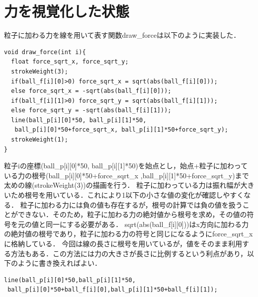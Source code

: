 \section{力を視覚化した状態}
粒子に加わる力を線を用いて表す関数draw\_forceは以下のように実装した．
\begin{screen}
{\small
\begin{verbatim}
void draw_force(int i){
  float force_sqrt_x, force_sqrt_y;
  strokeWeight(3);
  if(ball_f[i][0]>0) force_sqrt_x = sqrt(abs(ball_f[i][0]));
  else force_sqrt_x = -sqrt(abs(ball_f[i][0]));
  if(ball_f[i][1]>0) force_sqrt_y = sqrt(abs(ball_f[i][1]));
  else force_sqrt_y = -sqrt(abs(ball_f[i][1]));
  line(ball_p[i][0]*50, ball_p[i][1]*50,
   ball_p[i][0]*50+force_sqrt_x, ball_p[i][1]*50+force_sqrt_y);
  strokeWeight(1);
}
\end{verbatim}}
\end{screen}
粒子iの座標(ball\_p[i][0]*50, ball\_p[i][1]*50)を始点とし，始点+粒子に加わっている力の根号(ball\_p[i][0]*50+force\_sqrt\_x ,ball\_p[i][1]*50+force\_sqrt\_y)まで太めの線(strokeWeight(3))の描画を行う．
粒子に加わっている力は振れ幅が大きいため根号を用いている．これにより1以下の小さな値の変化が確認しやすくなる．
粒子に加わる力には負の値も存在するが，根号の計算では負の値を扱うことができない．そのため，粒子に加わる力の絶対値から根号を求め，その値の符号を元の値と同一にする必要がある．
sqrt(abs(ball\_f[i][0]))はx方向に加わる力の絶対値の根号であり，粒子に加わる力の符号と同じになるようにforce\_sqrt\_xに格納している．
今回は線の長さに根号を用いているが，値をそのまま利用する方法もある．この方法には力の大きさが長さに比例するという利点があり，以下のように書き換えればよい．
\begin{screen}
{\small
\begin{verbatim}
line(ball_p[i][0]*50,ball_p[i][1]*50,
 ball_p[i][0]*50+ball_f[i][0],ball_p[i][1]*50+ball_f[i][1]);
\end{verbatim}}
\end{screen}



